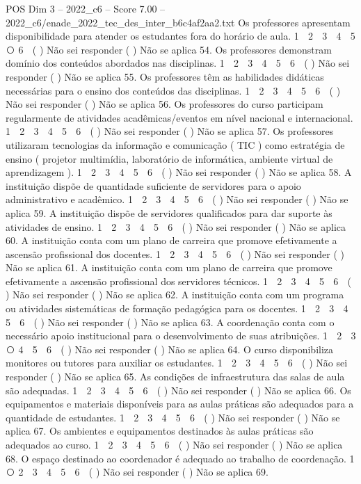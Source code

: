 \begin{textsample}{POS Dim 3 – 2022\_c6 – Score 7.00 – 2022\_c6/enade\_2022\_tec\_des\_inter\_b6c4af2aa2.txt}
Os professores apresentam disponibilidade para atender os estudantes fora do horário de aula. 1 ⃝ 2 ⃝ 3 ⃝ 4 ⃝ 5 ⃝ 6 ⃝ ( ) Não sei responder ( ) Não se aplica 54.
Os professores demonstram domínio dos conteúdos abordados nas disciplinas. 1 ⃝ 2 ⃝ 3 ⃝ 4 ⃝ 5 ⃝ 6 ⃝ ( ) Não sei responder ( ) Não se aplica 55.
Os professores têm as habilidades didáticas necessárias para o ensino dos conteúdos das disciplinas. 1 ⃝ 2 ⃝ 3 ⃝ 4 ⃝ 5 ⃝ 6 ⃝ ( ) Não sei responder ( ) Não se aplica 56.
Os professores do curso participam regularmente de atividades acadêmicas/eventos em nível nacional e internacional. 1 ⃝ 2 ⃝ 3 ⃝ 4 ⃝ 5 ⃝ 6 ⃝ ( ) Não sei responder ( ) Não se aplica 57.
Os professores utilizaram tecnologias da informação e comunicação ( TIC ) como estratégia de ensino ( projetor multimídia, laboratório de informática, ambiente virtual de aprendizagem ). 1 ⃝ 2 ⃝ 3 ⃝ 4 ⃝ 5 ⃝ 6 ⃝ ( ) Não sei responder ( ) Não se aplica 58.
A instituição dispõe de quantidade suficiente de servidores para o apoio administrativo e acadêmico. 1 ⃝ 2 ⃝ 3 ⃝ 4 ⃝ 5 ⃝ 6 ⃝ ( ) Não sei responder ( ) Não se aplica 59.
A instituição dispõe de servidores qualificados para dar suporte às atividades de ensino. 1 ⃝ 2 ⃝ 3 ⃝ 4 ⃝ 5 ⃝ 6 ⃝ ( ) Não sei responder ( ) Não se aplica 60.
A instituição conta com um plano de carreira que promove efetivamente a ascensão profissional dos docentes. 1 ⃝ 2 ⃝ 3 ⃝ 4 ⃝ 5 ⃝ 6 ⃝ ( ) Não sei responder ( ) Não se aplica 61.
A instituição conta com um plano de carreira que promove efetivamente a ascensão profissional dos servidores técnicos. 1 ⃝ 2 ⃝ 3 ⃝ 4 ⃝ 5 ⃝ 6 ⃝ ( ) Não sei responder ( ) Não se aplica 62.
A instituição conta com um programa ou atividades sistemáticas de formação pedagógica para os docentes. 1 ⃝ 2 ⃝ 3 ⃝ 4 ⃝ 5 ⃝ 6 ⃝ ( ) Não sei responder ( ) Não se aplica 63.
A coordenação conta com o necessário apoio institucional para o desenvolvimento de suas atribuições. 1 ⃝ 2 ⃝ 3 ⃝ 4 ⃝ 5 ⃝ 6 ⃝ ( ) Não sei responder ( ) Não se aplica 64.
O curso disponibiliza monitores ou tutores para auxiliar os estudantes. 1 ⃝ 2 ⃝ 3 ⃝ 4 ⃝ 5 ⃝ 6 ⃝ ( ) Não sei responder ( ) Não se aplica 65.
As condições de infraestrutura das salas de aula são adequadas. 1 ⃝ 2 ⃝ 3 ⃝ 4 ⃝ 5 ⃝ 6 ⃝ ( ) Não sei responder ( ) Não se aplica 66.
Os equipamentos e materiais disponíveis para as aulas práticas são adequados para a quantidade de estudantes. 1 ⃝ 2 ⃝ 3 ⃝ 4 ⃝ 5 ⃝ 6 ⃝ ( ) Não sei responder ( ) Não se aplica 67.
Os ambientes e equipamentos destinados às aulas práticas são adequados ao curso. 1 ⃝ 2 ⃝ 3 ⃝ 4 ⃝ 5 ⃝ 6 ⃝ ( ) Não sei responder ( ) Não se aplica 68.
O espaço destinado ao coordenador é adequado ao trabalho de coordenação. 1 ⃝ 2 ⃝ 3 ⃝ 4 ⃝ 5 ⃝ 6 ⃝ ( ) Não sei responder ( ) Não se aplica 69.

\end{textsample}
